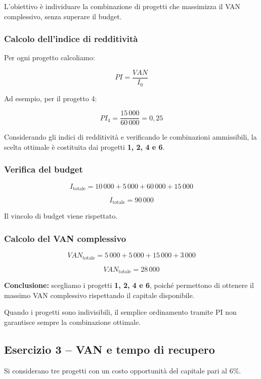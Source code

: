 \noindent L'obiettivo è individuare la combinazione di progetti
che massimizza il VAN complessivo, senza superare il budget.

\subsubsection*{Calcolo dell'indice di redditività}

\noindent Per ogni progetto calcoliamo:

\[
PI=\frac{VAN}{I_0}
\]

\noindent Ad esempio, per il progetto 4:

\[
PI_4=\frac{15\,000}{60\,000}=0{,}25
\]

\noindent Considerando gli indici di redditività e
verificando le combinazioni ammissibili,
la scelta ottimale è costituita dai progetti
\textbf{1, 2, 4 e 6}.

\subsubsection*{Verifica del budget}

\[
I_{\text{totale}}
=10\,000+5\,000+60\,000+15\,000
\]

\[
\boxed{I_{\text{totale}}=90\,000}
\]

\noindent Il vincolo di budget viene rispettato.

\subsubsection*{Calcolo del VAN complessivo}

\[
VAN_{\text{totale}}
=5\,000+5\,000+15\,000+3\,000
\]

\[
\boxed{VAN_{\text{totale}}=28\,000}
\]

\noindent \textbf{Conclusione:} scegliamo i progetti
\textbf{1, 2, 4 e 6}, poiché permettono di ottenere
il massimo VAN complessivo rispettando il capitale disponibile.

\medskip

\noindent Quando i progetti sono indivisibili,
il semplice ordinamento tramite PI non garantisce
sempre la combinazione ottimale.


\subsection{Esercizio 3 -- VAN e tempo di recupero}

\noindent Si considerano tre progetti con un costo opportunità
del capitale pari al $6\%$.

